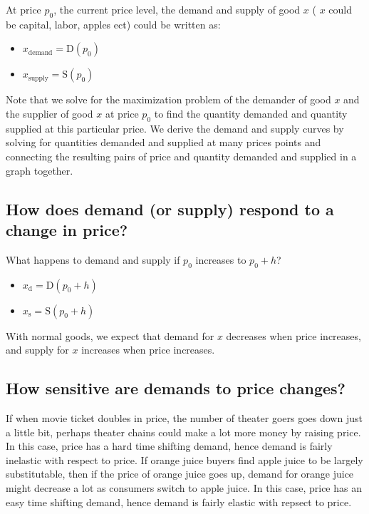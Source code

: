 \documentclass[
]{book}
\begin{document}
At price \(p_0\), the current price level, the demand and supply of good
\(x\) ( \(x\) could be capital, labor, apples ect) could be written as:

\begin{itemize}
\item
  \(\displaystyle x_{\textrm{demand}} =\textrm{D}(p_0 )\)
\item
  \(\displaystyle x_{\textrm{supply}} =\textrm{S}(p_0 )\)
\end{itemize}

Note that we solve for the maximization problem of the demander of good
\(x\) and the supplier of good \(x\) at price \(p_0\) to find the quantity
demanded and quantity supplied at this particular price. We derive the
demand and supply curves by solving for quantities demanded and supplied
at many prices points and connecting the resulting pairs of price and
quantity demanded and supplied in a graph together.

\hypertarget{how-does-demand-or-supply-respond-to-a-change-in-price}{%
\subsection{How does demand (or supply) respond to a change in price?}\label{how-does-demand-or-supply-respond-to-a-change-in-price}}

What happens to demand and supply if \(p_0\) increases to \(p_0 +h\)?

\begin{itemize}
\item
  \(\displaystyle x_{\textrm{d}} =\textrm{D}(p_0 +h)\)
\item
  \(\displaystyle x_{\textrm{s}} =\textrm{S}(p_0 +h)\)
\end{itemize}

With normal goods, we expect that demand for \(x\) decreases when price
increases, and supply for \(x\) increases when price increases.

\hypertarget{how-sensitive-are-demands-to-price-changes}{%
\subsection{How sensitive are demands to price changes?}\label{how-sensitive-are-demands-to-price-changes}}

If when movie ticket doubles in price, the number of theater goers goes
down just a little bit, perhaps theater chains could make a lot more
money by raising price. In this case, price has a hard time shifting
demand, hence demand is fairly inelastic with respect to price. If
orange juice buyers find apple juice to be largely substitutable, then
if the price of orange juice goes up, demand for orange juice might
decrease a lot as consumers switch to apple juice. In this case, price
has an easy time shifting demand, hence demand is fairly elastic with
repsect to price.
\end{document}
